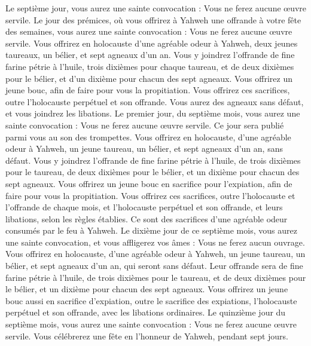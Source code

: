 \begin{multicols}{2}
Le septième jour, vous aurez une sainte convocation : Vous ne ferez aucune œuvre servile.
Le jour des prémices, où vous offrirez à Yahweh une offrande à votre fête des semaines, vous aurez une sainte convocation : Vous ne ferez aucune œuvre servile.
Vous offrirez en holocauste d'une agréable odeur à Yahweh, deux jeunes taureaux, un bélier, et sept agneaux d'un an.
Vous y joindrez l'offrande de fine farine pétrie à l'huile, trois dixièmes pour chaque taureau, et de deux dixièmes pour le bélier,
et d'un dixième pour chacun des sept agneaux.
Vous offrirez un jeune bouc, afin de faire pour vous la propitiation.
Vous offrirez ces sacrifices, outre l'holocauste perpétuel et son offrande. Vous aurez des agneaux sans défaut, et vous joindrez les libations.
\VerseOne{}Le premier jour, du septième mois, vous aurez une sainte convocation : Vous ne ferez aucune œuvre servile. Ce jour sera publié parmi vous au son des trompettes.
Vous offrirez en holocauste, d'une agréable odeur à Yahweh, un jeune taureau, un bélier, et sept agneaux d'un an, sans défaut.
Vous y joindrez l'offrande de fine farine pétrie à l'huile, de trois dixièmes pour le taureau, de deux dixièmes pour le bélier,
et un dixième pour chacun des sept agneaux.
Vous offrirez un jeune bouc en sacrifice pour l'expiation, afin de faire pour vous la propitiation.
Vous offrirez ces sacrifices, outre l'holocauste et l'offrande de chaque mois, et l'holocauste perpétuel et son offrande, et leurs libations, selon les règles établies. Ce sont des sacrifices d'une agréable odeur consumés par le feu à Yahweh.
Le dixième jour de ce septième mois, vous aurez une sainte convocation, et vous affligerez vos âmes : Vous ne ferez aucun ouvrage.
Vous offrirez en holocauste, d'une agréable odeur à Yahweh, un jeune taureau, un bélier, et sept agneaux d'un an, qui seront sans défaut.
Leur offrande sera de fine farine pétrie à l'huile, de trois dixièmes pour le taureau, et de deux dixièmes pour le bélier,
et un dixième pour chacun des sept agneaux.
Vous offrirez un jeune bouc aussi en sacrifice d'expiation, outre le sacrifice des expiations, l'holocauste perpétuel et son offrande, avec les libations ordinaires.
Le quinzième jour du septième mois, vous aurez une sainte convocation : Vous ne ferez aucune œuvre servile. Vous célébrerez une fête en l'honneur de Yahweh, pendant sept jours.

\end{multicols}
